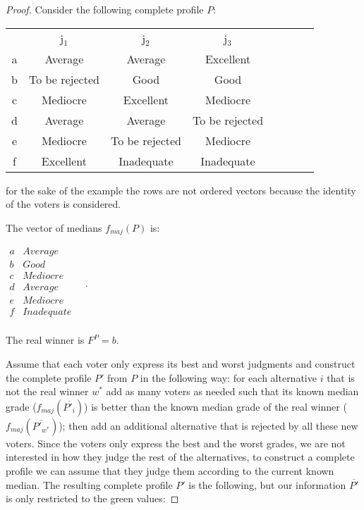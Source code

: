 \documentclass[version=3.21, pagesize, twoside=off, bibliography=totoc, DIV=calc, fontsize=12pt, a4paper]{scrartcl}
\begin{document}
\begin{proof} Consider the following complete profile $P$:
	
	\begin{center}
		\begin{tabular}{cccccccc}
			& j$_1$ & j$_2$ & j$_3$ \\
			a	&	Average	&	Average	&	Excellent	\\
			b	&	To be rejected	&	Good	&	Good	\\
			c	&	Mediocre	&	Excellent	&	Mediocre	\\
			d	&	Average	&	Average	&	To be rejected	\\
			e	&	Mediocre	&	To be rejected	&	Mediocre	\\
			f	&	Excellent	&	Inadequate	&	Inadequate \\
		\end{tabular}
	\end{center}
	
	
	for the sake of the example the rows are not ordered vectors because the identity of the voters is considered.
	
	The vector of medians $f_{maj}(P)$ is:
	\begin{center}
		$
		\begin{array}{cc}
			a &	Average \\
			b &	Good \\
			c &	Mediocre \\
			d &	Average	\\
			e &	Mediocre \\
			f & Inadequate \\
		\end{array} \quad.
		$
	\end{center}
	The real winner is $F^P=b$. 
	
	Assume that each voter only express its best and worst judgments and construct the complete profile $P'$ from $P$ in the following way: for each alternative $i$ that is not the real winner $w^*$ add as many voters as needed such that its known median grade ($f_{maj}(\overline{P'_i})$) is better than the known median grade of the real winner ($f_{maj}(\overline{P'_{w^*}})$); then add an additional alternative that is rejected by all these new voters. Since the voters only express the best and the worst grades, we are not interested in how they judge the rest of the alternatives, to construct a complete profile we can assume that they judge them according to the current known median. The resulting complete profile $P'$ is the following, but our information $\overline{P'}$ is only restricted to the green values: 
	

\end{proof}
\end{document}

